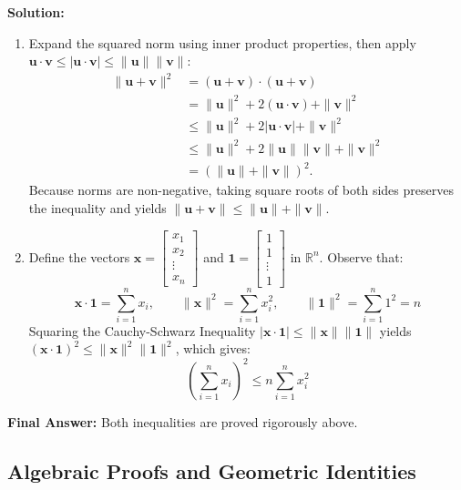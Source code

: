 \documentclass[11pt, letterpaper]{article}
\theoremstyle{definition}
\theoremstyle{remark}
\begin{document}
\textbf{Solution:}
\begin{enumerate}[label=(\alph*)]
    \item Expand the squared norm using inner product properties, then apply $\mathbf{u} \cdot \mathbf{v} \le |\mathbf{u} \cdot \mathbf{v}| \le \|\mathbf{u}\|\|\mathbf{v}\|$:
    \begin{align*}
    \|\mathbf{u} + \mathbf{v}\|^2 &= (\mathbf{u} + \mathbf{v}) \cdot (\mathbf{u} + \mathbf{v}) \\
    &= \|\mathbf{u}\|^2 + 2(\mathbf{u} \cdot \mathbf{v}) + \|\mathbf{v}\|^2 \\
    &\le \|\mathbf{u}\|^2 + 2|\mathbf{u} \cdot \mathbf{v}| + \|\mathbf{v}\|^2 \\
    &\le \|\mathbf{u}\|^2 + 2\|\mathbf{u}\|\|\mathbf{v}\| + \|\mathbf{v}\|^2 \\
    &= \left(\|\mathbf{u}\| + \|\mathbf{v}\|\right)^2.
    \end{align*}
    Because norms are non-negative, taking square roots of both sides preserves the inequality and yields $\|\mathbf{u} + \mathbf{v}\| \le \|\mathbf{u}\| + \|\mathbf{v}\|$.
    \item Define the vectors $\mathbf{x} = \begin{bmatrix} x_1 \\ x_2 \\ \vdots \\ x_n \end{bmatrix}$ and $\mathbf{1} = \begin{bmatrix} 1 \\ 1 \\ \vdots \\ 1 \end{bmatrix}$ in $\mathbb{R}^n$. Observe that:
    \[
    \mathbf{x} \cdot \mathbf{1} = \sum_{i=1}^{n} x_i, \qquad \|\mathbf{x}\|^2 = \sum_{i=1}^{n} x_i^2, \qquad \|\mathbf{1}\|^2 = \sum_{i=1}^{n} 1^2 = n
    \]
    Squaring the Cauchy-Schwarz Inequality $|\mathbf{x} \cdot \mathbf{1}| \le \|\mathbf{x}\|\|\mathbf{1}\|$ yields $(\mathbf{x} \cdot \mathbf{1})^2 \le \|\mathbf{x}\|^2 \|\mathbf{1}\|^2$, which gives:
    \[
    \left(\sum_{i=1}^{n} x_i\right)^2 \le n \sum_{i=1}^{n} x_i^2
    \]
\end{enumerate}
\textbf{Final Answer:} Both inequalities are proved rigorously above.

\subsection{Algebraic Proofs and Geometric Identities}
\end{document}
